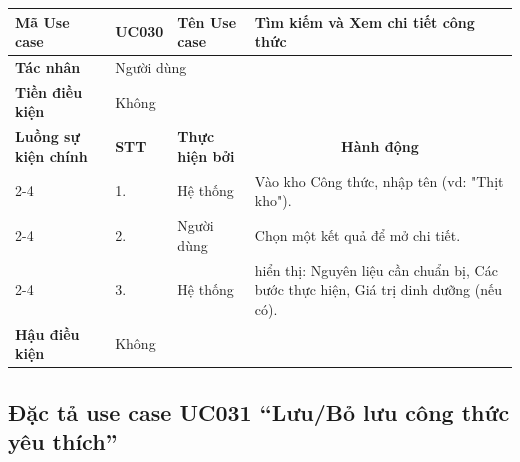 \documentclass[../main.tex]{subfiles}
\begin{document}
\begin{longtable}{|p{2.7cm}|p{0.8cm}|p{2.6cm}|p{7.3cm}|}
\hline
\cellcolor[HTML]{D5F5E3}\textbf{Mã Use case} & \multicolumn{1}{l|}{UC030} & \cellcolor[HTML]{D5F5E3}\textbf{Tên Use case} & Tìm kiếm và Xem chi tiết công thức \\ \hline
\cellcolor[HTML]{D5F5E3}\textbf{Tác nhân} & \multicolumn{3}{p{10.7cm}|}{Người dùng} \\ \hline
\cellcolor[HTML]{D5F5E3}\textbf{Tiền điều kiện} & \multicolumn{3}{p{10.7cm}|}{Không} \\ \hline

\cellcolor[HTML]{D5F5E3}\textbf{Luồng sự kiện chính} & \cellcolor[HTML]{FDEBD0}\textbf{STT} & \cellcolor[HTML]{FDEBD0}\textbf{Thực hiện bởi} & \multicolumn{1}{c|}{\cellcolor[HTML]{FDEBD0}\textbf{Hành động}} \\ \cline{2-4} 
\cellcolor[HTML]{D5F5E3} & 1. & Hệ thống & Vào kho Công thức, nhập tên (vd: "Thịt kho"). \\ \cline{2-4} 
\cellcolor[HTML]{D5F5E3} & 2. & Người dùng & Chọn một kết quả để mở chi tiết. \\ \cline{2-4} 
\cellcolor[HTML]{D5F5E3} & 3. & Hệ thống & hiển thị: Nguyên liệu cần chuẩn bị, Các bước thực hiện, Giá trị dinh dưỡng (nếu có). \\ \hline

\cellcolor[HTML]{D5F5E3}\textbf{Hậu điều kiện} & \multicolumn{3}{p{10.7cm}|}{Không} \\ \hline
\end{longtable}
\endgroup

\subsection{Đặc tả use case UC031 ``Lưu/Bỏ lưu công thức yêu thích''}
\vspace{0.5cm}

\begingroup
\renewcommand{\arraystretch}{1.5}
\end{document}
